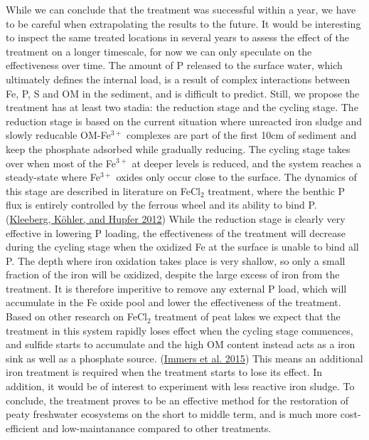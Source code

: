 \documentclass[a4paper,11pt]{article}
\begin{document}
While we can conclude that the treatment was successful within a year, we have to be careful when extrapolating the results to the future. It would be interesting to inspect the same treated locations in several years to assess the effect of the treatment on a longer timescale, for now we can only speculate on the effectiveness over time. The amount of P released to the surface water, which ultimately defines the internal load, is a result of complex interactions between Fe, P, S and OM in the sediment, and is difficult to predict. Still, we propose the treatment has at least two stadia: the reduction stage and the cycling stage. The reduction stage is based on the current situation where unreacted iron sludge and slowly reducable OM-Fe\(^{3+}\) complexes are part of the first 10cm of sediment and keep the phosphate adsorbed while gradually reducing. The cycling stage takes over when most of the Fe\(^{3+}\) at deeper levels is reduced, and the system reaches a steady-state where Fe\(^{3+}\) oxides only occur close to the surface. The dynamics of this stage are described in literature on FeCl\(_2\) treatment, where the benthic P flux is entirely controlled by the ferrous wheel and its ability to bind P. (\protect\hyperlink{ref-kleebergHowEffectivelyDoes2012}{Kleeberg, Köhler, and Hupfer 2012}) While the reduction stage is clearly very effective in lowering P loading, the effectiveness of the treatment will decrease during the cycling stage when the oxidized Fe at the surface is unable to bind all P. The depth where iron oxidation takes place is very shallow, so only a small fraction of the iron will be oxidized, despite the large excess of iron from the treatment. It is therefore imperitive to remove any external P load, which will accumulate in the Fe oxide pool and lower the effectiveness of the treatment. Based on other research on FeCl\(_2\) treatment of peat lakes we expect that the treatment in this system rapidly loses effect when the cycling stage commences, and sulfide starts to accumulate and the high OM content instead acts as a iron sink as well as a phosphate source. (\protect\hyperlink{ref-immersFightingInternalPhosphorus2015}{Immers et al. 2015}) This means an additional iron treatment is required when the treatment starts to lose its effect. In addition, it would be of interest to experiment with less reactive iron sludge. To conclude, the treatment proves to be an effective method for the restoration of peaty freshwater ecosystems on the short to middle term, and is much more cost-efficient and low-maintanance compared to other treatments.
\end{document}
